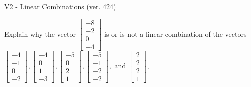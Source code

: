 \begin{exercise}
  \begin{exerciseTitle}V2 - Linear Combinations (ver. 424)\end{exerciseTitle}
  \begin{exerciseStatement}
    Explain why the vector \(\left[\begin{array}{c}
-8 \\
-2 \\
0 \\
-4
\end{array}\right]\)  is or is not a linear 
	combination of the vectors \(\left[\begin{array}{c}
-4 \\
-1 \\
0 \\
-2
\end{array}\right] , \left[\begin{array}{c}
-4 \\
0 \\
1 \\
-3
\end{array}\right] , \left[\begin{array}{c}
-5 \\
0 \\
2 \\
1
\end{array}\right] , \left[\begin{array}{c}
-5 \\
-1 \\
-2 \\
-2
\end{array}\right] , \text{ and } \left[\begin{array}{c}
2 \\
2 \\
2 \\
1
\end{array}\right]\).
	



\end{exerciseStatement}
\end{exercise}
